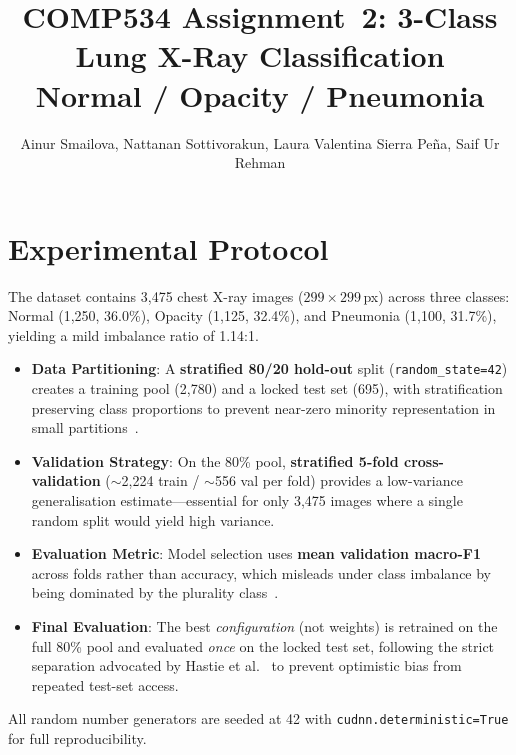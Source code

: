 \documentclass[11pt,a4paper]{article}
\title{\textbf{COMP534 Assignment~2: 3-Class Lung X-Ray Classification}\\[4pt]
\large Normal / Opacity / Pneumonia}
\author{Ainur Smailova, Nattanan Sottivorakun, Laura Valentina Sierra Peña,  Saif Ur Rehman}
\date{}
\begin{document}
\maketitle
\vspace{-8mm}

\section{Experimental Protocol}

The dataset contains 3{,}475 chest X-ray images ($299\!\times\!299$\,px) across three classes: Normal (1{,}250, 36.0\%), Opacity (1{,}125, 32.4\%), and Pneumonia (1{,}100, 31.7\%), yielding a mild imbalance ratio of 1.14:1. 

\begin{itemize}
    \item \textbf{Data Partitioning}: A \textbf{stratified 80/20 hold-out} split (\texttt{random\_state=42}) creates a training pool (2{,}780) and a locked test set (695), with stratification preserving class proportions to prevent near-zero minority representation in small partitions~\cite{raschka2018}.
    \item \textbf{Validation Strategy}: On the 80\% pool, \textbf{stratified 5-fold cross-validation} ($\sim$2{,}224 train / $\sim$556 val per fold) provides a low-variance generalisation estimate---essential for only 3{,}475 images where a single random split would yield high variance.
    \item \textbf{Evaluation Metric}: Model selection uses \textbf{mean validation macro-F1} across folds rather than accuracy, which misleads under class imbalance by being dominated by the plurality class~\cite{sokolova2009}.
    \item \textbf{Final Evaluation}: The best \emph{configuration} (not weights) is retrained on the full 80\% pool and evaluated \emph{once} on the locked test set, following the strict separation advocated by Hastie et al.~\cite{hastie2009} to prevent optimistic bias from repeated test-set access.
\end{itemize}

All random number generators are seeded at 42 with \texttt{cudnn.deterministic=True} for full reproducibility.
\end{document}
